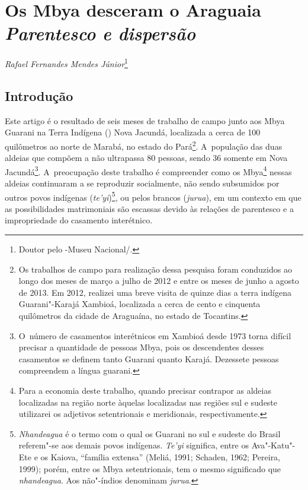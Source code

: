\thispagestyle{empty}

\chapter*{Os Mbya desceram o Araguaia\\
\large{\emph{Parentesco e dispersão}}}


\begin{flushright}
\emph{Rafael Fernandes Mendes Júnior}\footnote{Doutor pelo -Museu
Nacional/.}
\end{flushright}
\medskip

\section{Introdução}

Este artigo é o resultado de seis meses de trabalho de
campo
junto aos Mbya
Guarani na Terra Indígena () Nova Jacundá, localizada a cerca de 100
quilômetros ao norte de Marabá, no estado do Pará\footnote{Os trabalhos
de campo para realização dessa pesquisa foram conduzidos ao longo dos
meses de março a julho de 2012 e entre os meses de junho a agosto de
2013. Em 2012, realizei uma breve visita de quinze dias a terra
indígena Guarani"-Karajá Xambioá, localizada a cerca de cento e
cinquenta quilômetros da cidade de Araguaína, no estado de Tocantins.}.
A~população das duas aldeias que compõem a  não ultrapassa 80
pessoas, sendo 36 somente em Nova Jacundá\footnote{O~número de
casamentos interétnicos em Xambioá desde 1973 torna difícil precisar a
quantidade de pessoas Mbya, pois os descendentes desses casamentos se
definem tanto Guarani quanto Karajá. Dezessete pessoas compreendem a
língua guarani.}. A~preocupação deste trabalho é compreender como os
Mbya\footnote{Para a economia deste trabalho, quando precisar contrapor
as aldeias localizadas na região norte àquelas localizadas nas regiões
sul e sudeste utilizarei os adjetivos setentrionais e meridionais,
respectivamente.} nessas aldeias continuaram a se reproduzir
socialmente, não sendo subsumidos por outros povos indígenas
(\emph{te’yi})\footnote{\emph{Nhandeagua} é o termo com o qual os Guarani no sul e
sudeste do Brasil referem"-se aos demais povos indígenas. \emph{Te’yi}
significa, entre os Ava"-Katu"-Ete e os Kaiova, ``família extensa'' (Meliá,
1991; Schaden, 1962; Pereira, 1999); porém, entre os Mbya setentrionais,
tem o mesmo significado que \emph{nhandeagua}. Aos não"-índios denominam
\emph{jurua}.}, ou pelos brancos (\emph{jurua}), em um contexto em que as
possibilidades matrimoniais são escassas devido às relações de
parentesco e a impropriedade do casamento interétnico.

